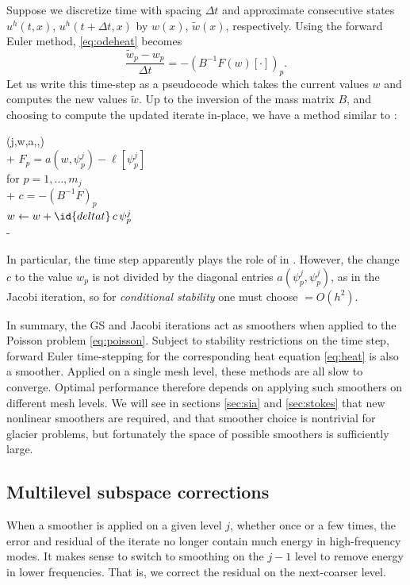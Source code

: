 \documentclass[letterpaper,final,12pt,reqno]{amsart}
\theoremstyle{claim}
\numberwithin{equation}{section}
\numberwithin{figure}{section}
\numberwithin{table}{section}
\numberwithin{theorem}{section}
\begin{document}
Suppose we discretize time with spacing $\Delta t$ and approximate consecutive states $u^h(t,x)$, $u^h(t+\Delta t,x)$ by $w(x)$, $\tilde w(x)$, respectively.  Using the forward Euler method, \eqref{eq:odeheat} becomes
\begin{equation}
\frac{\tilde w_p - w_p}{\Delta t} = - (B^{-1} F(w)[\cdot])_p. \label{eq:forwardeulerheat}
\end{equation}
Let us write this time-step as a pseudocode which takes the current values $w$ and computes the new values $\tilde w$.  Up to the inversion of the mass matrix $B$, and choosing to compute the updated iterate in-place, we have a method similar to :
\begin{pseudo*} \label{ps:euler-timestep}
(j,w,a,\ell,)\text{:} \\+
    $F_p = a(w,\psi_p^j) - \ell[\psi_p^j]$ \\
    for $p=1,\dots,m_j$ \\+
        $\displaystyle c = - (B^{-1} F)_p$  \\
        $w \gets w + \id{deltat}\, c\, \psi_p^j$ \\-
\end{pseudo*}
In particular, the time step  apparently plays the role of  in .  However, the change $c$ to the value $w_p$ is not divided by the diagonal entries $a(\psi_p^j,\psi_p^j)$, as in the Jacobi iteration, so for \emph{conditional stability} \cite{Bueler2021} one must choose  $=O(h^2)$.

In summary, the GS and Jacobi iterations act as smoothers when applied to the Poisson problem \eqref{eq:poisson}.  Subject to stability restrictions on the time step, forward Euler time-stepping for the corresponding heat equation \eqref{eq:heat} is also a smoother.  Applied on a single mesh level, these methods are all slow to converge.  Optimal performance therefore depends on applying such smoothers on different mesh levels.  We will see in sections \ref{sec:sia} and \ref{sec:stokes} that new nonlinear smoothers are required, and that smoother choice is nontrivial for glacier problems, but fortunately the space of possible smoothers is sufficiently large.

\subsection{Multilevel subspace corrections} \label{subsec:msc}  When a smoother is applied on a given level $j$, whether once or a few times, the error and residual of the iterate no longer contain much energy in high-frequency modes.  It makes sense to switch to smoothing on the $j-1$ level to remove energy in lower frequencies.  That is, we correct the residual on the next-coarser level.
\end{document}
